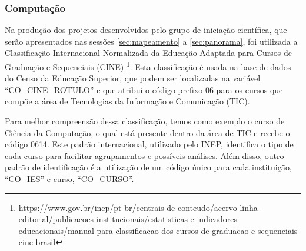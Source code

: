 \documentclass[12pt]{article}
\begin{document}




\subsubsection{Computação}
\label{subsubsec:computacao}

Na produção dos projetos desenvolvidos pelo grupo de iniciação científica, que serão apresentados nas sessões \ref{sec:mapeamento} a \ref{sec:panorama}, foi utilizada a Classificação Internacional Normalizada da Educação Adaptada para Cursos de Graduação e Sequenciais (CINE) \footnote{https://www.gov.br/inep/pt-br/centrais-de-conteudo/acervo-linha-editorial/publicacoes-institucionais/estatisticas-e-indicadores-educacionais/manual-para-classificacao-dos-cursos-de-graduacao-e-sequenciais-cine-brasil}. Esta classificação é usada na base de dados do Censo da Educação Superior, que podem ser localizadas na variável ``CO\_CINE\_ROTULO'' e que atribui o código prefixo 06 para os cursos que compõe a área de Tecnologias da Informação e Comunicação (TIC).

Para melhor compreensão dessa classificação, temos como exemplo o curso de Ciência da Computação, o qual está presente dentro da área de TIC e recebe o código 0614. Este padrão internacional, utilizado pelo INEP, identifica o tipo de cada curso para facilitar agrupamentos e possíveis análises. Além disso, outro padrão de identificação é a utilização de um código único para cada instituição, ``CO\_IES'' e curso, ``CO\_CURSO''.

\end{document}
